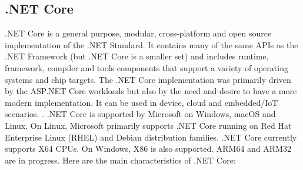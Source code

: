 \documentclass[../thesis.tex]{subfiles}
\begin{document}
\subsection{.NET Core}
\vspace{5mm}
.NET Core is a general purpose, modular, cross-platform and open source implementation of the .NET Standard. It contains many of the same APIs as the .NET Framework (but .NET Core is a smaller set) and includes runtime, framework, compiler and tools components that support a variety of operating systems and chip targets. The .NET Core implementation was primarily driven by the ASP.NET Core workloads but also by the need and desire to have a more modern implementation. It can be used in device, cloud and embedded/IoT scenarios. \cite{dotnet}.
\vspace{5mm}
.NET Core is supported by Microsoft on Windows, macOS and Linux. On Linux, Microsoft primarily supports .NET Core running on Red Hat Enterprise Linux (RHEL) and Debian distribution families. .NET Core currently supports X64 CPUs. On Windows, X86 is also supported. ARM64 and ARM32 are in progress.
\vspace{5mm}
Here are the main characteristics of .NET Core:
\vspace{5mm}
\end{document}
